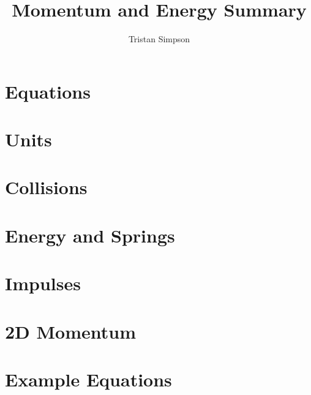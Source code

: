 \documentclass{article}
\title{Momentum and Energy Summary}
\author{Tristan Simpson}
\begin{document}
\maketitle

\section{Equations}
\let\clearpage\relax


\section{Units}
\let\clearpage\relax


\vspace*{0.5cm}
\section{Collisions}
\let\clearpage\relax


\section{Energy and Springs}
\let\clearpage\relax


\section{Impulses}
\let\clearpage\relax


\section{2D Momentum}
\let\clearpage\relax


\section{Example Equations}
\begin{adjustwidth}{1cm}{0pt}
    \let\clearpage\relax
    
    
    
    
    
\end{adjustwidth}
\end{document}
